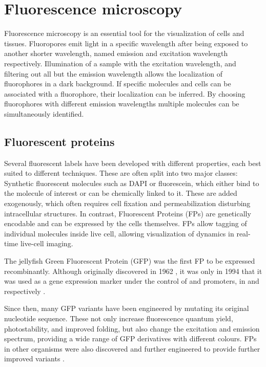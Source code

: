 \section{Fluorescence microscopy}

  Fluorescence microscopy is an essential tool
  for the visualization of cells and tissues.
  Fluoropores emit light in a specific wavelength after
  being exposed to another shorter wavelength, named
  emission and excitation wavelength respectively.
  Illumination of a sample with the excitation wavelength, and filtering
  out all but the emission wavelength allows
  the localization of fluorophores in a dark background.
  If specific molecules and cells can be associated with a fluorophore,
  their localization can be inferred.  By choosing fluorophores
  with different emission wavelengths multiple molecules can be
  simultaneously identified.

  \subsection{Fluorescent proteins}
    Several fluorescent labels have been developed with different
    properties, each best suited to different techniques.
    These are often split into two major classes:
    Synthetic fluorescent
    molecules such as DAPI or fluorescein, which either bind to the molecule of
    interest or can be chemically linked to it.
    These are added exogenously, which often requires cell
    fixation and permeabilization disturbing intracellular structures.
    In contrast, Fluorescent Proteins (FPs)
    are genetically encodable and can be expressed by the cells themselves.
    FPs allow tagging of individual molecules inside live cell, allowing
    visualization of dynamics in real-time live-cell imaging.

    The  jellyfish
    Green Fluorescent Protein (GFP) was
    the first FP to be expressed recombinantly.
    Although originally discovered in 1962 \citep{shimomura1962-gfp-discovery},
    it was only in 1994 that it was used as a gene expression
    marker under the control of  and
     promoters, in  and 
    respectively \citep{gfp-first-expression-marker}.

    Since then, many GFP variants have been engineered by mutating its
    original nucleotide sequence.  These not only increase fluorescence
    quantum yield, photostability, and improved folding, but also change
    the excitation and emission spectrum, providing a wide range of GFP
    derivatives with different colours.  FPs in other organisms were also
    discovered and further engineered to provide further improved
    variants \citep{FP-color-palette}.

